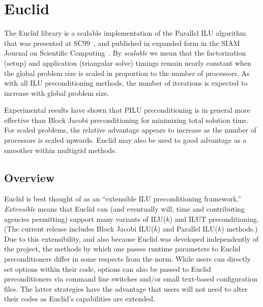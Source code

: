 
\section{Euclid}

The Euclid library is a scalable implementation of the Parallel ILU algorithm
that was presented at SC99~\cite{DHysom_APothen_1999}, and published in
expanded form in the SIAM Journal on Scientific
Computing~\cite{DHysom_APothen_2001}.  By {\em scalable} we mean that the
factorization (setup) and application (triangular solve) timings remain nearly
constant when the global problem size is scaled in proportion to the number of
processors.  As with all ILU preconditioning methods, the number of iterations
is expected to increase with global problem size.

Experimental results have shown that PILU preconditioning is in general
more effective than Block Jacobi preconditioning 
for minimizing total solution time.
For scaled problems, the relative advantage appears to increase 
as the number of processors is scaled upwards.
Euclid may also be used to good advantage as a smoother within 
multigrid methods.


\subsection{Overview}

Euclid is best thought of as an ``extensible ILU preconditioning
framework.''
{\em Extensible} means that Euclid can (and eventually will, time and
contributing agencies permitting) support many variants of ILU($k$)
and ILUT preconditioning.
(The current release includes Block Jacobi ILU($k$) and
Parallel ILU($k$) methods.)
Due to this extensibility, and also because Euclid was developed 
independently of the \hypre{} project, the methods by which one
passes runtime parameters to Euclid preconditioners
differ in some respects from the \hypre{} norm.
While users can directly set options within their code,
options can also be passed to Euclid preconditioners via
command line switches and/or small text-based configuration files.
The latter strategies have the advantage that users will not need to
alter their codes as Euclid's capabilities are extended.


